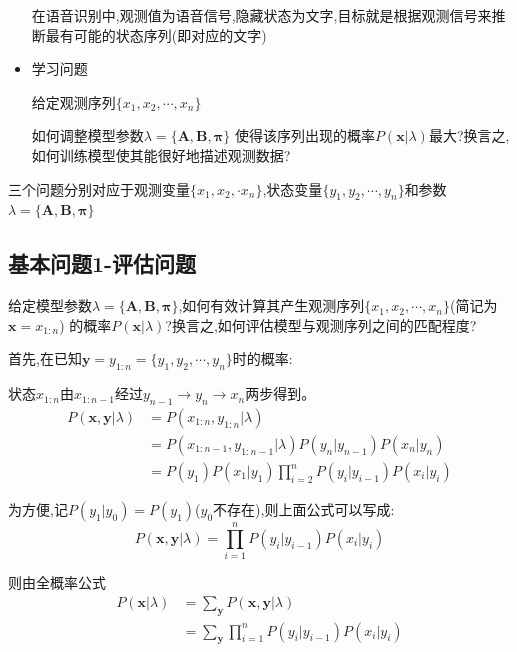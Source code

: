 \documentclass[UTF8,a4paper]{ctexart}%
\begin{document}
\begin{itemize}
                  {\color{blue}
                      在语音识别中,观测值为语音信号,隐藏状态为文字,目标就是根据观测信号来推断最有可能的状态序列(即对应的文字)
                  }

              \item 学习问题

                  给定观测序列$\{x_1, x_2, \cdots , x_n\}$

                  如何调整模型参数$\lambda = \{\bm{A,B,\pi}\}$ 使得该序列出现的概率$P(\bm{x} | \lambda)$最大?换言之,如何训练模型使其能很好地描述观测数据?

            \end{itemize}


            {\color{blue}
                三个问题分别对应于观测变量$\{x_1,x_2,\cdot x_n\}$,状态变量$\{y_1,y_2 , \cdots , y_n\}$和参数$\lambda = \{\bm{A,B,\pi}\}$
            }

        \subsection{基本问题1-评估问题}
            给定模型参数$\lambda = \{\bm{A,B,\pi}\}$,如何有效计算其产生观测序列$\{x_1, x_2, \cdots , x_n\}$(简记为$\bm{x} = x_{1:n}$) 的概率$P(\bm{x} | \lambda)$?换言之,如何评估模型与观测序列之间的匹配程度?

            首先,在已知$\bm{y} = y_{1:n} = \{y_1, y_2 , \cdots , y_n \}$时的概率:

            {\color{blue}
              状态$x_{1:n}$由$x_{1:n-1}$经过$y_{n-1}\to y_{n} \to x_{n}$两步得到。
            }
            \begin{equation}\begin{split}
              P(\bm{x,y}|\lambda) &= P(x_{1:n},y_{1:n} | \lambda)\\
              &= P(x_{1:n-1},y_{1:n-1} | \lambda)P(y_{n}|y_{n-1})P(x_n|y_{n})\\
              &= P(y_1)P(x_1|y_1)\prod_{i = 2}^n P(y_{i}|y_{i-1})P(x_i|y_{i})
            \end{split}\end{equation}

            为方便,记$P(y_1|y_0) = P(y_1)$($y_0$不存在),则上面公式可以写成:
            \begin{equation}
              P(\bm{x,y}|\lambda) = \prod_{i = 1}^n P(y_{i}|y_{i-1})P(x_i|y_{i})
            \end{equation}

            则由全概率公式
            \begin{equation}\begin{split}
                P(\bm{x}|\lambda) &= \sum_{\bm{y}}P(\bm{x,y}|\lambda) \\
                &= \sum_{\bm{y}} \prod_{i = 1}^n P(y_{i}|y_{i-1})P(x_i|y_{i})
            \end{split}\end{equation}
\end{document}

